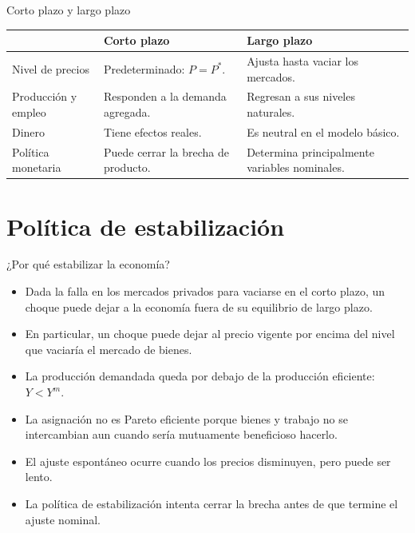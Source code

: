 \documentclass[aspectratio=169,11pt]{beamer}
\providecommand{\toprule}{\hline}
\providecommand{\midrule}{\hline}
\providecommand{\bottomrule}{\hline}
\begin{document}
\begin{frame}{Corto plazo y largo plazo}
  \small
  \renewcommand{\arraystretch}{1.35}
  \begin{tabularx}{\textwidth}{lYY}
    \toprule
      & \textbf{Corto plazo} & \textbf{Largo plazo} \\
    \midrule
    Nivel de precios
      & Predeterminado: \(P=P^*\).
      & Ajusta hasta vaciar los mercados. \\
    Producción y empleo
      & Responden a la demanda agregada.
      & Regresan a sus niveles naturales. \\
    Dinero
      & Tiene efectos reales.
      & Es neutral en el modelo básico. \\
    Política monetaria
      & Puede cerrar la brecha de producto.
      & Determina principalmente variables nominales. \\
    \bottomrule
  \end{tabularx}
\end{frame}

\section{Política de estabilización}

\begin{frame}{¿Por qué estabilizar la economía?}
  \small
  \begin{itemize}
    \setlength{\itemsep}{0.6em}
    \item Dada la falla en los mercados privados para vaciarse en el corto plazo, un choque puede dejar a la economía fuera de su equilibrio de largo plazo.
    \item En particular, un choque puede dejar al precio vigente por encima del nivel que vaciaría el mercado de bienes.
    \item La producción demandada queda por debajo de la producción eficiente: \(Y<Y^m\).
    \item La asignación no es Pareto eficiente porque bienes y trabajo no se intercambian aun cuando sería mutuamente beneficioso hacerlo.
    \item El ajuste espontáneo ocurre cuando los precios disminuyen, pero puede ser lento.
    \item La política de estabilización intenta cerrar la brecha antes de que termine el ajuste nominal.
  \end{itemize}
\end{frame}
\end{document}

